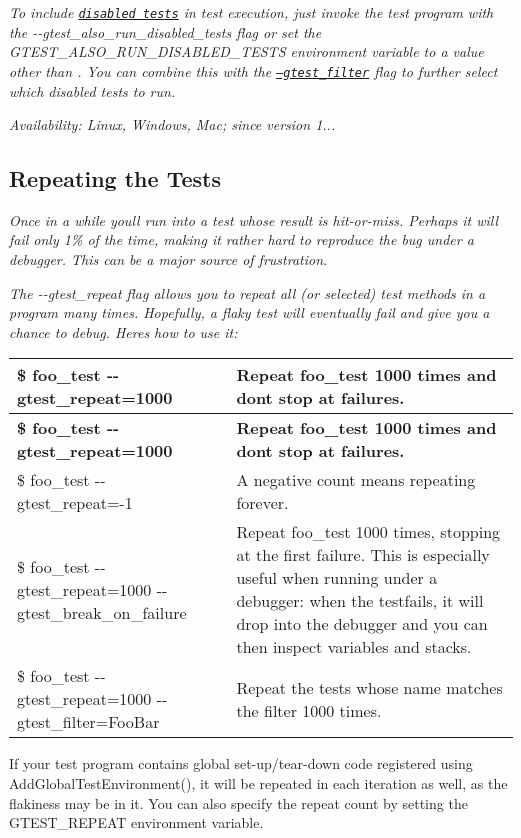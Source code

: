 {\itshape To include \href{#temporarily-disabling-tests}{\tt disabled tests} in test execution, just invoke the test program with the {\ttfamily -\/-\/gtest\+\_\+also\+\_\+run\+\_\+disabled\+\_\+tests} flag or set the {\ttfamily G\+T\+E\+S\+T\+\_\+\+A\+L\+S\+O\+\_\+\+R\+U\+N\+\_\+\+D\+I\+S\+A\+B\+L\+E\+D\+\_\+\+T\+E\+S\+TS} environment variable to a value other than {}. You can combine this with the \href{#running-a-subset-of-the-tests}{\tt --gtest\+\_\+filter} flag to further select which disabled tests to run.}

{\itshape {\itshape Availability\+:} Linux, Windows, Mac; since version 1...}

{\itshape \subsection*{Repeating the Tests}}

{\itshape }

{\itshape Once in a while you\textquotesingle{}ll run into a test whose result is hit-\/or-\/miss. Perhaps it will fail only 1\% of the time, making it rather hard to reproduce the bug under a debugger. This can be a major source of frustration.}

{\itshape The {\ttfamily -\/-\/gtest\+\_\+repeat} flag allows you to repeat all (or selected) test methods in a program many times. Hopefully, a flaky test will eventually fail and give you a chance to debug. Here\textquotesingle{}s how to use it\+:}

{\itshape \tabulinesep=1mm
\begin{longtabu} spread 0pt [c]{*{2}{|X[-1]}|}
\hline
\rowcolor{\tableheadbgcolor}\textbf{ {\ttfamily \$ foo\+\_\+test -\/-\/gtest\+\_\+repeat=1000} }&\textbf{ Repeat foo\+\_\+test 1000 times and don\textquotesingle{}t stop at failures.  }\\
\endfirsthead
\hline
\endfoot
\hline
\rowcolor{\tableheadbgcolor}\textbf{ {\ttfamily \$ foo\+\_\+test -\/-\/gtest\+\_\+repeat=1000} }&\textbf{ Repeat foo\+\_\+test 1000 times and don\textquotesingle{}t stop at failures.  }\\
\endhead
{\ttfamily \$ foo\+\_\+test -\/-\/gtest\+\_\+repeat=-\/1} &A negative count means repeating forever. \\
{\ttfamily \$ foo\+\_\+test -\/-\/gtest\+\_\+repeat=1000 -\/-\/gtest\+\_\+break\+\_\+on\+\_\+failure} &Repeat foo\+\_\+test 1000 times, stopping at the first failure. This is especially useful when running under a debugger\+: when the testfails, it will drop into the debugger and you can then inspect variables and stacks. \\
{\ttfamily \$ foo\+\_\+test -\/-\/gtest\+\_\+repeat=1000 -\/-\/gtest\+\_\+filter=Foo\+Bar} &Repeat the tests whose name matches the filter 1000 times. \\
\end{longtabu}
If your test program contains global set-\/up/tear-\/down code registered using {\ttfamily Add\+Global\+Test\+Environment()}, it will be repeated in each iteration as well, as the flakiness may be in it. You can also specify the repeat count by setting the {\ttfamily G\+T\+E\+S\+T\+\_\+\+R\+E\+P\+E\+AT} environment variable.}

